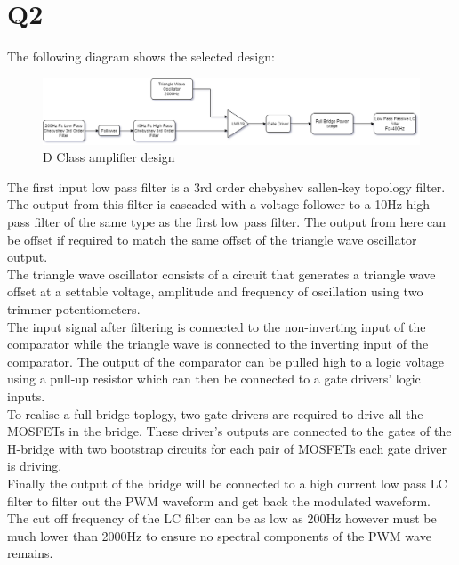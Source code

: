 \documentclass[]{article}
\begin{document}
	\section{Q2}
	The following diagram shows the selected design:
	\begin{figure}[H]
		\centering
		\includegraphics[width=1\linewidth]{Topology}
		\caption{D Class amplifier design}
		\label{fig:untitled-diagram-4}
	\end{figure}
\begin{multicols}{2}
	The first input low pass filter is a 3rd order chebyshev sallen-key topology filter. The output from this filter is cascaded with a voltage follower to a 10Hz high pass filter of the same type as the first low pass filter. The output from here can be offset if required to match the same offset of the triangle wave oscillator output.\\
	The triangle wave oscillator consists of a circuit that generates a triangle wave offset at a settable voltage, amplitude and frequency of oscillation using two trimmer potentiometers.\\
	The input signal after filtering is connected to the non-inverting input of the comparator while the triangle wave is connected to the inverting input of the comparator.
	The output of the comparator can be pulled high to a logic voltage using a pull-up resistor which can then be connected to a gate drivers' logic inputs.\\
	To realise a full bridge toplogy, two gate drivers are required to drive all the MOSFETs in the bridge. These driver's outputs are connected to the gates of the H-bridge with two bootstrap circuits for each pair of MOSFETs each gate driver is driving.\\
	Finally the output of the bridge will be connected to a high current low pass LC filter to filter out the PWM waveform and get back the modulated waveform. The cut off frequency of the LC filter can be as low as 200Hz however must be much lower than 2000Hz to ensure no spectral components of the PWM wave remains.\\

\end{multicols}
\end{document}
